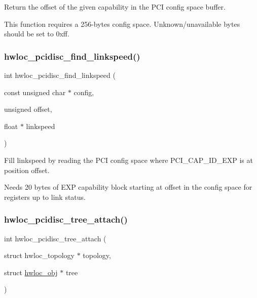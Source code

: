 Return the offset of the given capability in the P\+CI config space buffer. 

This function requires a 256-\/bytes config space. Unknown/unavailable bytes should be set to 0xff. \mbox{\label{a00232_ga51d1ebcbf9729987c9d17df3aa57d209}} 
\subsubsection{\texorpdfstring{hwloc\+\_\+pcidisc\+\_\+find\+\_\+linkspeed()}{hwloc\_pcidisc\_find\_linkspeed()}}
{\footnotesize\ttfamily int hwloc\+\_\+pcidisc\+\_\+find\+\_\+linkspeed (\begin{DoxyParamCaption}\item[{const unsigned char $\ast$}]{config,  }\item[{unsigned}]{offset,  }\item[{float $\ast$}]{linkspeed }\end{DoxyParamCaption})}



Fill linkspeed by reading the P\+CI config space where P\+C\+I\+\_\+\+C\+A\+P\+\_\+\+I\+D\+\_\+\+E\+XP is at position offset. 

Needs 20 bytes of E\+XP capability block starting at offset in the config space for registers up to link status. \mbox{\label{a00232_gabda1d6c1799e50b9226f8a4da9bd29ea}} 
\subsubsection{\texorpdfstring{hwloc\+\_\+pcidisc\+\_\+tree\+\_\+attach()}{hwloc\_pcidisc\_tree\_attach()}}
{\footnotesize\ttfamily int hwloc\+\_\+pcidisc\+\_\+tree\+\_\+attach (\begin{DoxyParamCaption}\item[{struct hwloc\+\_\+topology $\ast$}]{topology,  }\item[{struct \hyperlink{a00238}{hwloc\+\_\+obj} $\ast$}]{tree }\end{DoxyParamCaption})}



